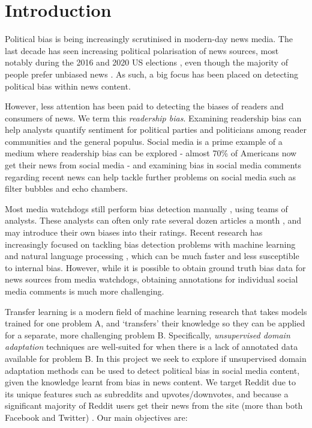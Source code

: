 \chapter{Introduction}

Political bias is being increasingly scrutinised in modern-day news media. The last decade has seen increasing political polarisation of news sources, most notably during the 2016 and 2020 US elections \cite{us-election}, even though the majority of people prefer unbiased news \cite{pew-unbiased}. As such, a big focus has been placed on detecting political bias within news content.

However, less attention has been paid to detecting the biases of readers and consumers of news. We term this \textit{readership bias}. Examining readership bias can help analysts quantify sentiment for political parties and politicians among reader communities and the general populus. Social media is a prime example of a medium where readership bias can be explored - almost 70\% of Americans now get their news from social media \cite{pew-social-media-news-2018} - and examining bias in social media comments regarding recent news can help tackle further problems on social media such as filter bubbles and echo chambers.

Most media watchdogs still perform bias detection manually \cite{mbfc} \cite{media-bias-chart}, using teams of analysts. These analysts can often only rate several dozen articles a month \cite{ad-fontes-methodology}, and may introduce their own biases into their ratings. Recent research has increasingly focused on tackling bias detection problems with machine learning and natural language processing \cite{bipartisan-press} \cite{baly-emnlp18}, which can be much faster and less susceptible to internal bias. However, while it is possible to obtain ground truth bias data for news sources from media watchdogs, obtaining annotations for individual social media comments is much more challenging.

Transfer learning is a modern field of machine learning research that takes models trained for one problem A, and `transfers' their knowledge so they can be applied for a separate, more challenging problem B. Specifically, \textit{unsupervised domain adaptation} techniques are well-suited for when there is a lack of annotated data available for problem B. In this project we seek to explore if unsupervised domain adaptation methods can be used to detect political bias in social media content, given the knowledge learnt from bias in news content. We target Reddit due to its unique features such as subreddits and upvotes/downvotes, and because a significant majority of Reddit users get their news from the site (more than both Facebook and Twitter) \cite{pew-social-media-news-2018}. Our main objectives are:


